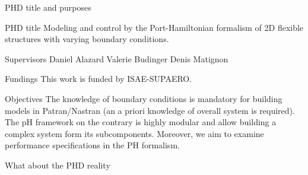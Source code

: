\documentclass[aspectratio=169]{ISAE-Beamer}
\begin{document}
\begin{frame}{PHD title and purposes}

\begin{block}{PHD title}
	Modeling and control by the Port-Hamiltonian formalism of 2D flexible structures with varying boundary conditions.
\end{block}
\begin{block}{Supervisors}
	Daniel Alazard \hspace{1.5cm} Valerie Budinger 
	\hspace{1.5cm}
	Denis Matignon
\end{block}
\begin{block}{Fundings}
	This work is funded by ISAE-SUPAERO.
\end{block} 

\begin{block}{Objectives}
	The knowledge of boundary conditions is mandatory for building models in Patran/Nastran (an a priori knowledge of overall system is required).  The pH framework on the contrary is highly modular and allow building a complex system form its subcomponents. Moreover, we aim to examine performance specifications in the PH formalism.
\end{block}
\end{frame}

\begin{frame}{What about the PHD reality}
	
\end{frame}
\end{document}
